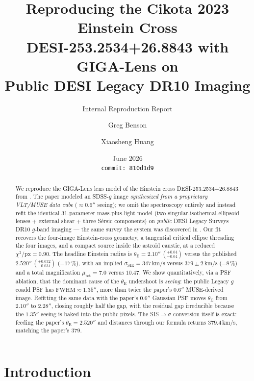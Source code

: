 \documentclass[11pt,letterpaper]{article}
\title{Reproducing the Cikota 2023 Einstein Cross\\
       DESI-253.2534+26.8843 with GIGA-Lens on\\
       Public DESI Legacy DR10 Imaging}
\author{Greg Benson \and Xiaosheng Huang}
\date{June 2026 \\ \texttt{commit:~810d1d9}}
\newcommand{\thetaE}{\ensuremath{\theta_{\mathrm{E}}}}
\newcommand{\sigmaSIE}{\ensuremath{\sigma_{\mathrm{SIE}}}}
\renewcommand{\arcsec}{\ensuremath{''}}
\begin{document}
\maketitle
\subtitle{Internal Reproduction Report}

\begin{abstract}
We reproduce the GIGA-Lens \autocite{gu2022gigalens} lens model of the
Einstein cross DESI-253.2534+26.8843 from \citet{cikota2023einstein}.
The paper modeled an SDSS-$g$ image \emph{synthesized from a proprietary
VLT/MUSE data cube} ($\approx0.6\arcsec$ seeing); we omit the
spectroscopy entirely and instead refit the identical 31-parameter
mass-plus-light model (two singular-isothermal-ellipsoid lenses
$+$ external shear $+$ three S\'ersic components) on \emph{public} DESI
Legacy Surveys DR10 $g$-band imaging --- the same survey the system was
discovered in \autocite{huang2021discovery}. Our fit recovers the
four-image Einstein-cross geometry, a tangential critical ellipse
threading the four images, and a compact source inside the astroid
caustic, at a reduced $\chi^2 / \mathrm{px} = 0.90$. The headline
Einstein radius is $\thetaE = 2.10\arcsec\,(^{+0.04}_{-0.04})$ versus the
published $2.520\arcsec\,(^{+0.032}_{-0.031})$ ($-17\,\%$), with an
implied $\sigmaSIE = 347\,$km/s versus $379\pm2\,$km/s ($-8\,\%$) and a
total magnification $\mu_{\mathrm{tot}} = 7.0$ versus $10.47$. We show
quantitatively, via a PSF ablation, that the dominant cause of the
$\thetaE$ undershoot is \emph{seeing}: the public Legacy $g$ coadd PSF
has $\mathrm{FWHM}\approx1.35\arcsec$, more than twice the paper's
$0.6\arcsec$ MUSE-derived image. Refitting the same data with the
paper's $0.6\arcsec$ Gaussian PSF moves $\thetaE$ from $2.10\arcsec$ to
$2.28\arcsec$, closing roughly half the gap, with the residual gap
irreducible because the $1.35\arcsec$ seeing is baked into the public
pixels. The SIS$\to\sigma$ conversion itself is exact: feeding the paper's
$\thetaE = 2.520\arcsec$ and distances through our formula returns
$379.4\,$km/s, matching the paper's $379$.
\end{abstract}

\tableofcontents

\bigskip

\section{Introduction}
\end{document}
